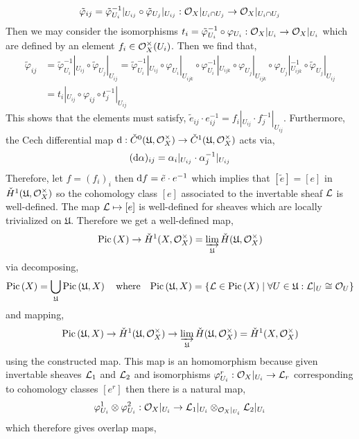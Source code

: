 \documentclass[12pt]{article}
\begin{document}
\[ \tilde{\varphi}_{ij} = \tilde{\varphi}_{U_i}^{-1} |_{U_{ij}} \circ \tilde{\varphi}_{U_j} |_{U_{ij}} : \mathcal{O}_{X} |_{U_i \cap U_j} \to \mathcal{O}_{X} |_{U_i \cap U_j} \]
Then we may consider the isomorphisms $t_i = \tilde{\varphi}_{U_i}^{-1} \circ \varphi_{U_i} : \mathcal{O}_{X} |_{U_i} \to \mathcal{O}_{X} |_{U_i}$ which are defined by an element $f_i \in \mathcal{O}_{X}^\times(U_i)$. Then we find that,
\begin{align*}
\tilde{\varphi}_{ij} & = \tilde{\varphi}_{U_i}^{-1} |_{U_{ij}} \circ \tilde{\varphi}_{U_j} |_{U_{ij}} = \tilde{\varphi}_{U_i}^{-1} |_{U_{ij}} \circ \varphi_{U_i} |_{U_{ijk}} \circ \varphi_{U_i}^{-1} |_{U_{ijk}} \circ \varphi_{U_j} |_{U_{ijk}} \circ  \varphi_{U_j} |_{U_{ijk}}^{-1} \circ \tilde{\varphi}_{U_j} |_{U_{ij}} 
\\
& = t_i |_{U_{ij}} \circ \varphi_{ij} \circ t_j^{-1} |_{U_{ij}}
\end{align*}
This shows that the elements must satisfy, $\tilde{e}_{ij} \cdot e_{ij}^{-1} = f_i |_{U_{ij}} \cdot f_j^{-1} |_{U_{ij}}$. Furthermore, the Cech differential map $\mathrm{d} : \check{C}^0(\mathfrak{U}, \mathcal{O}_{X}^\times) \to \check{C}^1(\mathfrak{U}, \mathcal{O}_{X}^\times)$ acts via,
\[ (\mathrm{d}{\alpha})_{ij} = \alpha_{i} |_{U_{ij}} \cdot \alpha_{j}^{-1} |_{U_{ij}}  \]
Therefore, let $f = (f_i)_i$ then $\mathrm{d}{f} = \tilde{e} \cdot e^{-1}$ which implies that $[\tilde{e}] = [e]$ in $\check{H}^1(\mathfrak{U}, \mathcal{O}_{X}^\times)$ so the cohomology class $[e]$ associated to the invertable sheaf $\mathcal{L}$ is well-defined. The map $\mathcal{L} \mapsto [e]$ is well-defined for sheaves which are locally trivialized on $\mathfrak{U}$. Therefore we get a well-defined map,
\[ \mathrm{Pic} \left( X \right) \to \check{H}^1(X, \mathcal{O}_{X}^\times) = \varinjlim_{\mathfrak{U}} \check{H}(\mathfrak{U}, \mathcal{O}_{X}^\times) \]
via decomposing,
\[ \mathrm{Pic} \left( X \right) = \bigcup_{\mathfrak{U}} \mathrm{Pic} \left( \mathfrak{U}, X \right) \quad \text{where} \quad \mathrm{Pic} \left( \mathfrak{U}, X \right) = \{ \mathcal{L} \in \mathrm{Pic} \left( X \right) \mid \forall U \in \mathfrak{U} : \mathcal{L}|_U \cong \mathcal{O}_{U} \} \]
and mapping,
\[ \mathrm{Pic} \left( \mathfrak{U}, X \right) \to \check{H}^1(\mathfrak{U}, \mathcal{O}_{X}^\times) \to \varinjlim_{\mathfrak{U}} \check{H}(\mathfrak{U}, \mathcal{O}_{X}^\times) = \check{H}^1(X, \mathcal{O}_{X}^\times) \]
using the constructed map. This map is an homomorphism because given invertable sheaves $\mathcal{L}_1$ and $\mathcal{L}_2$ and isomorphisms $\varphi^r_{U_i} : \mathcal{O}_{X} |_{U_i} \to \mathcal{L}_r$ corresponding to cohomology classes $[e^r]$ then there is a natural map,
\[ \varphi^1_{U_i} \otimes \varphi^2_{U_i} : \mathcal{O}_{X}|_{U_i} \to \mathcal{L}_1 |_{U_i} \otimes_{\mathcal{O}_{X} |_{U_i}} \mathcal{L}_2 |_{U_i} \]
which therefore gives overlap maps,
\end{document}
